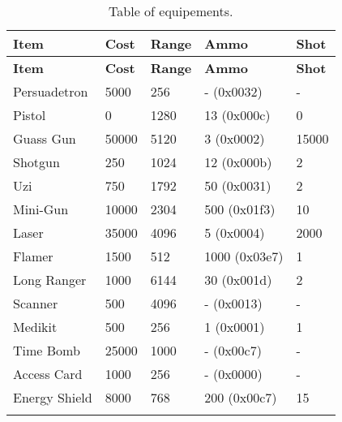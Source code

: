 \documentclass[a4paper,twoside,12pt,dvips]{article}
\begin{document}
\begin{center}
  \begin{longtable}{|l|l|l|l|l|}

    \hline \textbf{Item} & \textbf{Cost} & \textbf{Range} & \textbf{Ammo} & \textbf{Shot} \\ \hline 
    \endfirsthead

    \hline \textbf{Item} & \textbf{Cost} & \textbf{Range} & \textbf{Ammo} & \textbf{Shot} \\ \hline 
    \endhead


Persuadetron  & 5000  & 256  & -  (0x0032)  & -     \\
\hline 
Pistol        & 0     & 1280 & 13 (0x000c)  & 0     \\
\hline 
Guass Gun     & 50000 & 5120 & 3  (0x0002)  & 15000 \\
\hline 
Shotgun       & 250   & 1024 & 12 (0x000b)  & 2     \\
\hline 
Uzi           & 750   & 1792 & 50 (0x0031)  & 2     \\
\hline 
Mini-Gun      & 10000 & 2304 & 500 (0x01f3) & 10    \\
\hline 
Laser         & 35000 & 4096 & 5  (0x0004)  & 2000  \\
\hline 
Flamer        & 1500  & 512  & 1000 (0x03e7) & 1     \\
\hline 
Long Ranger   & 1000  & 6144 & 30 (0x001d)  & 2     \\
\hline 
Scanner       & 500   & 4096 & -  (0x0013)  & -     \\
\hline 
Medikit       & 500   & 256  & 1  (0x0001)  & 1     \\
\hline 
Time Bomb     & 25000 & 1000 & -  (0x00c7)  & -     \\
\hline 
Access Card   & 1000  & 256  & -  (0x0000)  & -     \\
\hline 
Energy Shield & 8000  & 768  & 200 (0x00c7) & 15    \\
\hline 

    \caption[Table of equipements]{Table of equipements.} \label{tab:equipements} \\

  \end{longtable}
\end{center}
\end{document}

